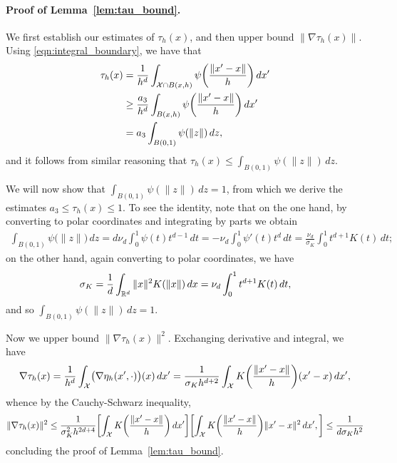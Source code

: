 \paragraph{Proof of Lemma~\ref{lem:tau_bound}.}
We first establish our estimates of $\tau_h(x)$, and then upper bound $\|\nabla\tau_h(x)\|$. Using \eqref{eqn:integral_boundary}, we have that
\begin{align*}
\tau_h(x) & = \frac{1}{h^d} \int_{\mathcal{X} \cap B(x,h)} \psi\biggl(\frac{\|x' - x\|}{h}\biggr) \,dx' \\
& \geq \frac{a_3}{h^d} \int_{B(x,h)} \psi\biggl(\frac{\|x' - x\|}{h}\biggr) \,dx' \\
& = a_3\int_{B(0,1)} \psi(\|z\|) \,dz,
\end{align*}
and it follows from similar reasoning that $\tau_h(x) \leq \int_{B(0,1)} \psi(\|z\|) \,dz$. 

We will now show that $\int_{B(0,1)} \psi(\|z\|) \,dz = 1$, from which we derive the estimates $a_3 \leq \tau_h(x) \leq 1$. To see the identity, note that on the one hand, by converting to polar coordinates and integrating by parts we obtain
\begin{align*}
\int_{B(0,1)} \psi\bigl(\|z\|\bigr) \,dz = d \nu_d \int_{0}^{1} \psi(t) t^{d - 1} \,dt = -\nu_d \int_{0}^{1} \psi'(t) t^{d} \,dt = \frac{\nu_d}{\sigma_K} \int_{0}^{1} t^{d + 1} K(t) \,dt;
\end{align*}
on the other hand, again converting to polar coordinates, we have
\begin{equation*}
\sigma_K = \frac{1}{d} \int_{\mathbb{R}^d} \|x\|^2 K(\|x\|) \,dx = \nu_d \int_{0}^{1}t^{d + 1} K(t) \,dt,
\end{equation*}
and so $\int_{B(0,1)} \psi(\|z\|) \,dz = 1$.

Now we upper bound $\|\nabla\tau_h(x)\|^2$. Exchanging derivative and integral, we have
\begin{align*}
\nabla\tau_h(x) = \frac{1}{h^d} \int_{\mathcal{X}} \bigl(\nabla \eta_h(x',\cdot)\bigr)(x) \,dx' = \frac{1}{\sigma_K h^{d + 2}} \int_{\mathcal{X}} K\biggl(\frac{\|x' - x\|}{h}\biggr)(x' - x)\,dx',
\end{align*}
whence by the Cauchy-Schwarz inequality,
\begin{equation*}
\|\nabla\tau_h(x)\|^2 \leq \frac{1}{\sigma_K^2 h^{2d + 4}} \biggl[\int_{\mathcal{X}} K\biggl(\frac{\|x' - x\|}{h}\biggr)\,dx'\biggr] \biggl[\int_{\mathcal{X}} K\biggl(\frac{\|x' - x\|}{h}\biggr)\|x' - x\|^2\,dx',\biggr] \leq \frac{1}{d\sigma_K h^{2}}
\end{equation*}
concluding the proof of Lemma~\ref{lem:tau_bound}. 

